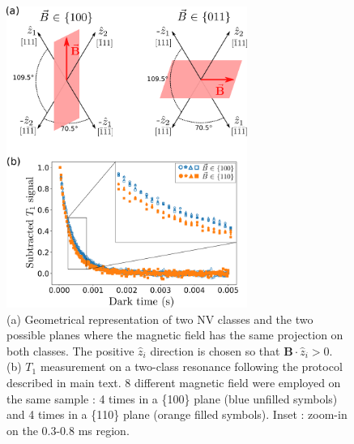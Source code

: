 \documentclass[preprintnumbers,amsmath,amssymb,onecolumn,12pt]{revtex4-2}\usepackage{graphicx}%
\begin{document}
\begin{figure}
\includegraphics[width=0.7\textwidth]{Figures_SI/121_VS_22}
\caption{(a) Geometrical representation of two NV classes and the two possible planes where the magnetic field has the same projection on both classes. The positive $\hat z_i$ direction is chosen so that $\bm{B}\cdot \hat{z}_i >0$. (b) $T_1$ measurement on a two-class resonance following the protocol described in main text. 8 different magnetic field were employed on the same sample : 4 times in a \{100\} plane (blue unfilled symbols) and 4 times in a \{110\} plane (orange filled symbols). Inset : zoom-in on the 0.3-0.8 ms region.}
\label{121 VS 22 fig}
\end{figure}
\end{document}

